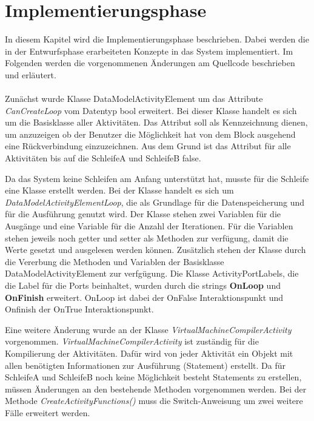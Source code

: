     \chapter{Implementierungsphase}
    In diesem Kapitel wird die Implementierungsphase beschrieben. 
    Dabei werden die in der Entwurfsphase erarbeiteten Konzepte in das System implementiert. \cite{24}
    Im Folgenden werden die vorgenommenen Änderungen am Quellcode beschrieben und erläutert.\\
    \\
    Zunächst wurde Klasse DataModelActivityElement um das Attribute \textit{CanCreateLoop} vom Datentyp bool erweitert. 
    Bei dieser Klasse handelt es sich um die Basisklasse aller Aktivitäten.
    Das Attribut soll als Kennzeichnung dienen, um anzuzeigen ob der Benutzer die Möglichkeit hat von dem Block ausgehend eine Rückverbindung einzuzeichnen. 
    Aus dem Grund ist das Attribut für alle Aktivitäten bis auf die SchleifeA und SchleifeB false. \par
    Da das System keine Schleifen am Anfang unterstützt hat, musste für die Schleife eine Klasse erstellt werden.
    Bei der Klasse handelt es sich um \textit{DataModelActivityElementLoop}, die als Grundlage für die Datenspeicherung und für die Ausführung genutzt wird.
    Der Klasse stehen zwei Variablen für die Ausgänge und eine Variable für die Anzahl der Iterationen. 
    Für die Variablen stehen jeweils noch getter und setter als Methoden zur verfügung, damit die Werte gesetzt und ausgelesen werden können.
    Zusätzlich stehen der Klasse durch die Vererbung die Methoden und Variablen der Basisklasse DataModelActivityElement zur verfgügung.
    Die Klasse ActivityPortLabels, die die Label für die Ports beinhaltet, wurden durch die strings \textbf{OnLoop} und \textbf{OnFinish} erweitert.
    OnLoop ist dabei der OnFalse Interaktionspunkt und Onfinish der OnTrue Interaktionspunkt. \par
    Eine weitere Änderung wurde an der Klasse \textit{VirtualMachineCompilerActivity} vorgenommen.
    \textit{VirtualMachineCompilerActivity} ist zuständig für die Kompilierung der Aktivitäten. 
    Dafür wird von jeder Aktivität ein Objekt mit allen benötigten Informationen zur Ausführung (Statement) erstellt.
    Da für SchleifeA und SchleifeB noch keine Möglichkeit besteht Statements zu erstellen, müssen Änderungen an den bestehende Methoden vorgenommen werden.
    Bei der Methode \textit{CreateActivityFunctions()} muss die Switch-Anweisung um zwei weitere Fälle erweitert werden.
